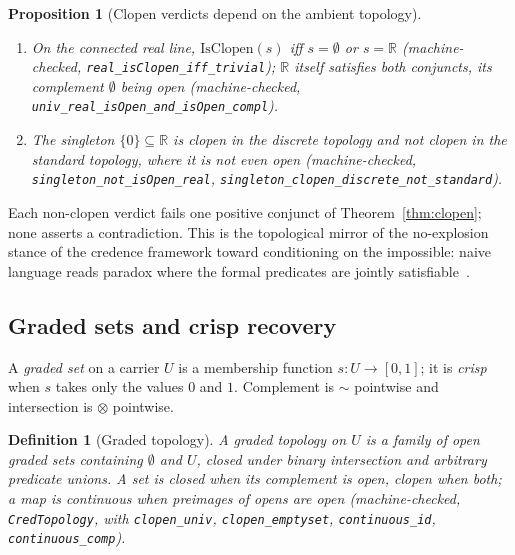 \documentclass[11pt,a4paper]{article}
\newtheorem{proposition}[theorem]{Proposition}
\newtheorem{definition}[theorem]{Definition}
\newcommand{\negc}{\mathord{\sim}}
\newcommand{\conjc}{\otimes}
\newcommand{\Real}{\mathbb{R}}
\begin{document}
\begin{proposition}[Clopen verdicts depend on the ambient topology]
\label{thm:clopenexamples}
\begin{enumerate}[label=\textup{(\alph*)},nosep]
\item On the connected real line, $\mathrm{IsClopen}(s)$ iff
  $s = \emptyset$ or $s = \Real$
  (machine-checked, \texttt{real\_isClopen\_iff\_trivial});
  $\Real$ itself satisfies both conjuncts, its complement $\emptyset$
  being open
  (machine-checked, \texttt{univ\_real\_isOpen\_and\_isOpen\_compl}).
\item The singleton $\{0\} \subseteq \Real$ is clopen in the discrete
  topology and not clopen in the standard topology, where it is not
  even open
  (machine-checked, \texttt{singleton\_not\_isOpen\_real},
  \texttt{singleton\_clopen\_discrete\_not\_standard}).
\end{enumerate}
\end{proposition}

Each non-clopen verdict fails one positive conjunct of
Theorem~\ref{thm:clopen}; none asserts a contradiction.
This is the topological mirror of the no-explosion stance of the
credence framework toward conditioning on the impossible: naive
language reads paradox where the formal predicates are jointly
satisfiable~\cite{priest1979,belnap1977}.

\subsection{Graded sets and crisp recovery}

A \emph{graded set} on a carrier $U$ is a membership function
$s : U \to [0,1]$; it is \emph{crisp} when $s$ takes only the values
$0$ and $1$.
Complement is $\negc$ pointwise and intersection is $\conjc$
pointwise.

\begin{definition}[Graded topology]
\label{def:credtopology}
A \emph{graded topology} on $U$ is a family of \emph{open} graded sets
containing $\emptyset$ and $U$, closed under binary intersection and
arbitrary predicate unions.
A set is \emph{closed} when its complement is open, \emph{clopen} when
both; a map is \emph{continuous} when preimages of opens are open
(machine-checked, \texttt{CredTopology}, with
\texttt{clopen\_univ}, \texttt{clopen\_emptyset},
\texttt{continuous\_id}, \texttt{continuous\_comp}).
\end{definition}
\end{document}
